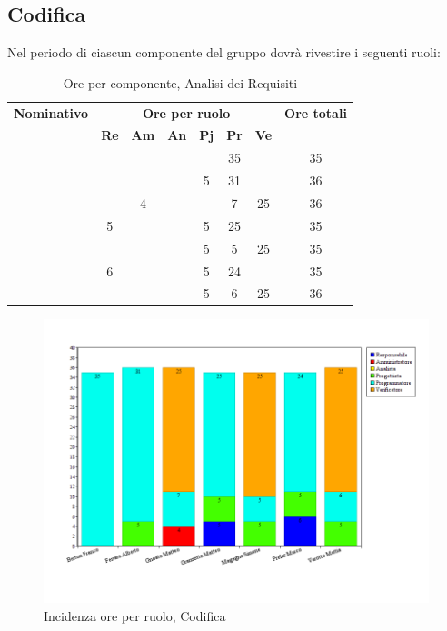 \subsection{Codifica}
Nel periodo di \CO ciascun componente del gruppo dovrà rivestire i seguenti ruoli:
\begin{table}[H]
	\begin{center}
		\begin{tabular}{|c|c|c|c|c|c|c|c|}
			\hline
			\textbf{Nominativo} & \multicolumn{6}{c|}{\textbf{Ore per ruolo}} & \textbf{Ore totali} \\
			& \textbf{Re} & \textbf{Am} & \textbf{An} & \textbf{Pj} & \textbf{Pr} & \textbf{Ve} & \\
			\hline
			\FB		&		&		&		&		&	35	&		&	35	\\
			\hline	
			\AF		&		&		&		&	 5	&	31	&		& 	36	\\
			\hline		
			\GN		&		&	4	&		&		&	7	&	25	&	36	\\
			\hline						
			\GR	&	5	&	 	&		&	5	&	25 	& 		&	35	\\
			\hline
			\SM 		&		&		&		&	5	&	5	& 	25	&	35	\\
			\hline
			\MP 		& 	6	&		&		&	5	&	24	&		&	35	\\
			\hline
			\MV 		&		&		&		&	5	&	6	&	25	& 	36	\\
			\hline			
		\end{tabular}
	\end{center}
	\caption{Ore per componente, Analisi dei Requisiti}
\end{table}

\begin{figure}[H]
	\centering
	\includegraphics[scale=0.4]{immagini/Grafi/GrafoCod}
	\caption{Incidenza ore per ruolo, Codifica}
\end{figure}

